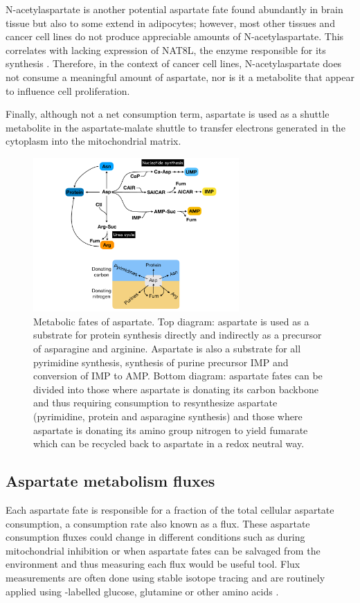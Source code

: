 N-acetylaspartate is another potential aspartate fate found abundantly in brain tissue but also to some extend in adipocytes; however, most other tissues and cancer cell lines do not produce appreciable amounts of N-acetylaspartate.
This correlates with lacking expression of NAT8L, the enzyme responsible for its synthesis \cite{Alkan2020-td}.
Therefore, in the context of cancer cell lines, N-acetylaspartate does not consume a meaningful amount of aspartate, nor is it a metabolite that appear to influence cell proliferation.

Finally, although not a net consumption term, aspartate is used as a shuttle metabolite in the aspartate-malate shuttle to transfer electrons generated in the cytoplasm into the mitochondrial matrix.

\begin{figure}
    \centering
    \includegraphics[width=0.70\textwidth]{figures/chap1/asp_fates.pdf}
    \caption[Metabolic fates of aspartate.]{
    Metabolic fates of aspartate.
    Top diagram: aspartate is used as a substrate for protein synthesis directly and indirectly as a precursor of asparagine and arginine.
    Aspartate is also a substrate for all pyrimidine synthesis, synthesis of purine precursor IMP and conversion of IMP to AMP.
    Bottom diagram: aspartate fates can be divided into those where aspartate is donating its carbon backbone and thus requiring \NAD{} consumption to resynthesize aspartate (pyrimidine, protein and asparagine synthesis) and those where aspartate is donating its amino group nitrogen to yield fumarate which can be recycled back to aspartate in a redox neutral way.
    }
    \label{fig:ch1:asp_fates}
\end{figure}




\subsection{Aspartate metabolism fluxes}
Each aspartate fate is responsible for a fraction of the total cellular aspartate consumption, a consumption rate also known as a flux.
These aspartate consumption fluxes could change in different conditions such as during mitochondrial inhibition or when aspartate fates can be salvaged from the environment and thus measuring each flux would be useful tool.
Flux measurements are often done using stable isotope tracing and are routinely applied using \hCi{}-labelled glucose, glutamine or other amino acids \cite{Yuan2008-eu, Park2016-ap, Jang2018-ey, Bartman2021-ey}.

